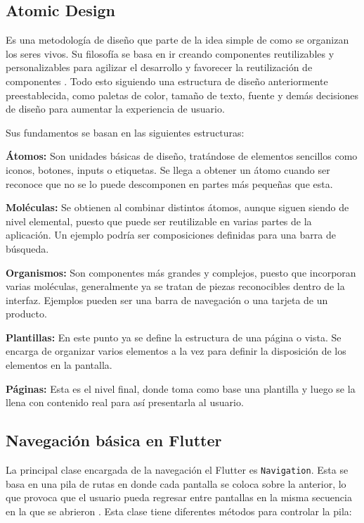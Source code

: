 \subsection{Atomic Design}
Es una metodología de diseño que parte de la idea simple de como se organizan los seres vivos. Su filosofía se basa en ir creando componentes reutilizables y personalizables para agilizar el desarrollo y favorecer la reutilización de componentes \parencite{Garca2024}. Todo esto siguiendo una estructura de diseño anteriormente preestablecida, como paletas de color, tamaño de texto, fuente y demás decisiones de diseño para aumentar la experiencia de usuario.

Sus fundamentos se basan en las siguientes estructuras:

\textbf{Átomos:} Son unidades básicas de diseño, tratándose de elementos sencillos como iconos, botones, inputs o etiquetas. Se llega a obtener un átomo cuando ser reconoce que no se lo puede descomponen en partes más pequeñas que esta.

\textbf{Moléculas:} Se obtienen al combinar distintos átomos, aunque siguen siendo de nivel elemental, puesto que puede ser reutilizable en varias partes de la aplicación. Un ejemplo podría ser composiciones definidas para una barra de búsqueda.

\textbf{Organismos:} Son componentes más grandes y complejos, puesto que incorporan varias moléculas, generalmente ya se tratan de piezas reconocibles dentro de la interfaz. Ejemplos pueden ser una barra de navegación o una tarjeta de un producto.

\textbf{Plantillas:} En este punto ya se define la estructura de una página o vista. Se encarga de organizar varios elementos a la vez para definir la disposición de los elementos en la pantalla.

\textbf{Páginas:} Esta es el nivel final, donde toma como base una plantilla y luego se la llena con contenido real para así presentarla al usuario.

\subsection{Navegación básica en Flutter}

La principal clase encargada de la navegación el Flutter es \lstinline{Navigation}. Esta se basa en una pila de rutas en donde cada pantalla se coloca sobre la anterior, lo que provoca que el usuario pueda regresar entre pantallas en la misma secuencia en la que se abrieron \parencite{Grados2023}. Esta clase tiene diferentes métodos para controlar la pila:


